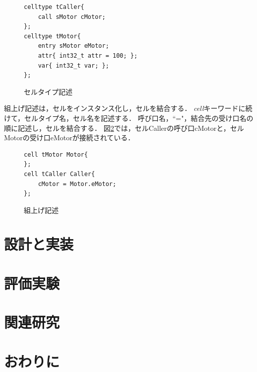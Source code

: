 \documentclass[submit]{ipsj_v2/UTF8/ipsj}
\begin{document}
\begin{figure}[t]
\centering
\begin{lstlisting}
celltype tCaller{
    call sMotor cMotor;
};
celltype tMotor{
    entry sMotor eMotor;
    attr{ int32_t attr = 100; };
    var{ int32_t var; };
};
\end{lstlisting}
\caption{セルタイプ記述}  
\label{celltype}
\end{figure}

        組上げ記述は，セルをインスタンス化し，セルを結合する．
        {\it cell}キーワードに続けて，セルタイプ名，セル名を記述する．
        呼び口名，``="，結合先の受け口名の順に記述し，セルを結合する．
        図\ref{build}では，セルCallerの呼び口cMotorと，セルMotorの受け口eMotorが接続されている．
        
\begin{figure}[t]
\centering
\begin{lstlisting}
cell tMotor Motor{
};
cell tCaller Caller{
    cMotor = Motor.eMotor;
};
\end{lstlisting}
\caption{組上げ記述}
\label{build}
\end{figure}


\section{設計と実装}
\label{sec:Design and Implementation}


\section{評価実験}
\label{sec:Evaluation}

\section{関連研究}
\label{sec:Related Work}

\section{おわりに}
\label{sec:Conclusion}



\end{document}
